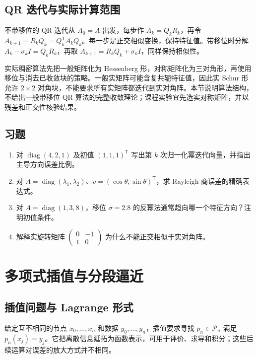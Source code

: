 \documentclass[UTF8,12pt,a4paper,fontset=fandol]{ctexbook}
\begin{document}
\section{QR 迭代与实际计算范围}
不带移位的 QR 迭代从 $A_0=A$ 出发，每步作 $A_k=Q_kR_k$，再令 $A_{k+1}=R_kQ_k=Q_k^{\mathsf T}A_kQ_k$。每一步是正交相似变换，保持特征值。带移位时分解 $A_k-\sigma_kI=Q_kR_k$，再取 $A_{k+1}=R_kQ_k+\sigma_kI$，同样保持相似性。

实际稠密算法先把一般矩阵化为 Hessenberg 形，对称矩阵化为三对角形，再使用移位与消去已收敛块的策略。一般实矩阵可能含复共轭特征值，因此实 Schur 形允许 $2\times2$ 对角块，不能要求所有实矩阵都迭代到实对角阵。本节说明算法结构，不给出一般带移位 QR 算法的完整收敛理论；课程实验宜先选实对称矩阵，并以残差和正交性核验结果。

\section{习题}
\begin{enumerate}[label=\arabic*.]
\item\label{exr:na-eigen-power} 对 $\operatorname{diag}(4,2,1)$ 及初值 $(1,1,1)^{\mathsf T}$ 写出第 $k$ 次归一化幂迭代向量，并指出主导方向误差比例。
\item\label{exr:na-eigen-rayleigh} 对 $A=\operatorname{diag}(\lambda_1,\lambda_2)$、$v=(\cos\theta,\sin\theta)^{\mathsf T}$，求 Rayleigh 商误差的精确表达式。
\item\label{exr:na-eigen-shift} 对 $A=\operatorname{diag}(1,3,8)$，移位 $\sigma=2.8$ 的反幂法通常趋向哪一个特征方向？注明初值条件。
\item\label{exr:na-eigen-rotation} 解释实旋转矩阵 $\begin{pmatrix}0&-1\\1&0\end{pmatrix}$ 为什么不能正交相似于实对角阵。
\end{enumerate}

\chapter{多项式插值与分段逼近}
\label{chap:na-interpolation}

\section{插值问题与 Lagrange 形式}
给定互不相同的节点 $x_0,\ldots,x_n$ 和数据 $y_0,\ldots,y_n$，插值要求寻找 $p_n\in\mathcal P_n$ 满足 $p_n(x_j)=y_j$。它把离散信息延拓为函数表示，可用于评价、求导和积分；这些后续运算对误差的放大方式并不相同。
\end{document}
